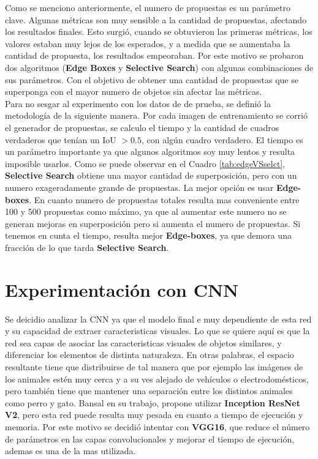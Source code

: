Como se menciono anteriormente, el numero de propuestas es un parámetro clave. Algunas métricas son muy sensible a la cantidad de propuestas, afectando los resultados finales. Esto surgió, cuando se obtuvieron las primeras métricas, los valores estaban muy lejos de los esperados, y a medida que se aumentaba la cantidad de propuesta, los resultados empeoraban. Por este motivo se probaron dos algoritmos (\textbf{Edge Boxes} y \textbf{Selective Search}) con algunas combinaciones de sus parámetros. Con el objetivo de obtener una cantidad de propuestas que se superponga con el mayor numero de objetos sin afectar las métricas.\\

Para no sesgar al experimento con los datos de de prueba, se definió la metodología de la siguiente manera. Por cada imagen de entrenamiento se corrió el generador de propuestas, se calculo el tiempo y la cantidad de cuadros verdaderos que tenían un IoU $> 0.5$, con algún cuadro verdadero. El tiempo es un parámetro importante ya que algunos algoritmos soy muy lentos y resulta imposible usarlos. Como se puede observar en el Cuadro \ref{tab:edgeVSselct}, \textbf{Selective Search} obtiene una mayor cantidad de superposición, pero con un numero exageradamente grande de propuestas. La mejor opción es usar \textbf{Edge-boxes}. En cuanto numero de propuestas totales resulta mas conveniente entre 100 y 500 propuestas como máximo, ya que al aumentar este numero no se generan mejoras en superposición pero si aumenta el numero de propuestas. Si tenemos en cunta el tiempo, resulta mejor \textbf{Edge-boxes}, ya que demora una fracción de lo que tarda \textbf{Selective Search}.\\

\section{Experimentación con CNN}
Se deicidio analizar la CNN ya que el modelo final e muy dependiente de esta red y su capacidad de extraer caracteristicas visuales. Lo que se quiere aquí es que la red sea capas de asociar las caracteristicas visuales de objetos similares, y diferenciar los elementos de distinta naturaleza. En otras palabras, el espacio resultante tiene que distribuirse de tal manera que por ejemplo las imágenes de los animales estén muy cerca y a su ves alejado de vehículos o electrodomésticos, pero también tiene que mantener una separación entre los distintos animales como perro y gato. Bansal en su trabajo, propone utilizar \textbf{Inception ResNet V2}, pero esta red puede resulta muy pesada en cuanto a tiempo de ejecución y memoria. Por este motivo se decidió intentar con \textbf{VGG16}, que reduce el número de parámetros en las capas convolucionales y mejorar el tiempo de ejecución, ademas es una de la mas utilizada.\\

